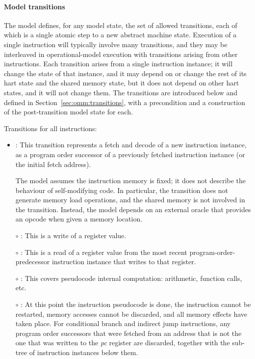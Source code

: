\paragraph{Model transitions}
The model defines, for any model state, the set of allowed transitions, each of which is a single atomic step to a new abstract machine state.
Execution of a single instruction will typically involve many
transitions, and they may be interleaved in operational-model
execution with transitions arising from other instructions. 
Each transition arises from a single instruction instance; it will
change the state of that instance, and it may depend on or change the
rest of its hart state and the shared memory state, but it does not depend on other hart states, and it will not change them.
The transitions are introduced below and defined in Section~\ref{sec:omm:transitions}, with a precondition and a construction of the post-transition model state for each.

\noindent Transitions for all instructions:
\begin{itemize}
\item {}: This transition represents a fetch and
  decode of a new instruction instance, as a program order successor
  of a previously fetched instruction instance (or the initial fetch
  address).

The model assumes the instruction memory is fixed; it does not
describe the behaviour of self-modifying code. 
In particular, the  transition does not generate memory load operations, and the shared memory is not involved in the transition.
Instead, the model depends on an external oracle that provides an opcode when given a memory location.
%


\item[$\circ$] : This is a write of a register value.
\item[$\circ$] : This is a read of a register
  value from the most recent program-order-predecessor instruction instance that writes to that register.
\item[$\circ$] : This covers pseudocode
  internal computation: arithmetic, function calls, etc.
\item[$\circ$] : At this point the instruction pseudocode is done, the instruction cannot be restarted, memory accesses cannot be discarded, and all memory effects have taken place.
For conditional branch and indirect jump instructions, any program order successors that were fetched from an address that is not the one that was written to the {\em pc} register are discarded, together with the sub-tree of instruction instances below them.
\end{itemize}

